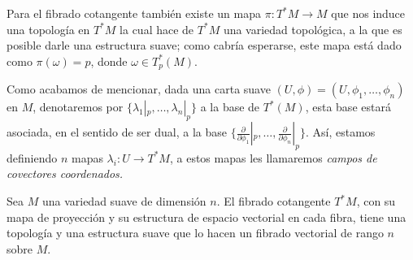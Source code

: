 Para el fibrado cotangente también existe un mapa $\pi: T^{*}M \to M$ que nos induce una topología en $T^{*}M$ la cual hace de $T^{*}M$ una variedad topológica, a la que es posible darle una estructura suave; como cabría esperarse, este mapa está dado como $\pi(\omega) = p$, donde $\omega \in T_p^{*}(M)$.

Como acabamos de mencionar, dada una carta suave $(U,\phi) = (U,\phi_1,\ldots,\phi_n)$ en $M$, denotaremos por $\{\lambda_1|_p,\ldots,\lambda_n|_p\}$ a la base de $T^*(M)$, esta base estará asociada, en el sentido de ser dual, a la base $\{\frac{\partial}{\partial \phi_1}|_p, \ldots, \frac{\partial}{\partial \phi_n}|_p\}$. Así, estamos definiendo $n$ mapas $\lambda_i: U \to T^{*}M$, a estos mapas les llamaremos \it{campos de covectores coordenados}.

\begin{theorem}
	Sea $M$ una variedad suave de dimensión $n$. El fibrado cotangente $T^{*}M$, con su mapa de proyección y su estructura de espacio vectorial en cada fibra, tiene una topología y una estructura suave que lo hacen un fibrado vectorial de rango $n$ sobre $M$.
\end{theorem}

